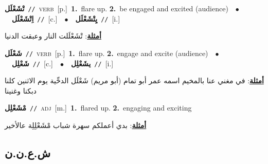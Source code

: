 \documentclass[10pt,a4paper,twoside]{article} %
\begin{document}
\begin{multicols}{2}
{\setlength\topsep{0pt}\textbf{\foreignlanguage{arabic}{تْشَعْلَل}}\ {\color{gray}\texttt{//}\color{black}}\ \textsc{verb}\ [p.]\ \textbf{1.}~flare up.  \textbf{2.}~be engaged and excited (audience)\ \ $\bullet$\ \ \setlength\topsep{0pt}\textbf{\foreignlanguage{arabic}{اِتْشَعْلَل}}\ {\color{gray}\texttt{//}\color{black}}\ [c.]\ \ $\bullet$\ \ \setlength\topsep{0pt}\textbf{\foreignlanguage{arabic}{يِتْشَعْلَل}}\ {\color{gray}\texttt{//}\color{black}}\ [i.]\  \begin{flushright}\color{gray}\foreignlanguage{arabic}{\textbf{\underline{\foreignlanguage{arabic}{أمثلة}}}: تْشَعْلَلت النار وعبقت الدنيا}\end{flushright}\color{black}} \vspace{2mm}

{\setlength\topsep{0pt}\textbf{\foreignlanguage{arabic}{شَعْلَل}}\ {\color{gray}\texttt{//}\color{black}}\ \textsc{verb}\ [p.]\ \textbf{1.}~flare up.  \textbf{2.}~engage and excite (audience)\ \ $\bullet$\ \ \setlength\topsep{0pt}\textbf{\foreignlanguage{arabic}{شَعْلِل}}\ {\color{gray}\texttt{//}\color{black}}\ [c.]\ \ $\bullet$\ \ \setlength\topsep{0pt}\textbf{\foreignlanguage{arabic}{يشَعْلِل}}\ {\color{gray}\texttt{//}\color{black}}\ [i.]\  \begin{flushright}\color{gray}\foreignlanguage{arabic}{\textbf{\underline{\foreignlanguage{arabic}{أمثلة}}}: في مغني عنا بالمخيم اسمه عمر أبو تمام (أبو مريم) شَعْلَل الدحِّية يوم الاثنين كلنا دبكنا وغنينا}\end{flushright}\color{black}} \vspace{2mm}

{\setlength\topsep{0pt}\textbf{\foreignlanguage{arabic}{مْشَعْلِل}}\ {\color{gray}\texttt{//}\color{black}}\ \textsc{adj}\ [m.]\ \textbf{1.}~flared up.  \textbf{2.}~engaging and exciting\  \begin{flushright}\color{gray}\foreignlanguage{arabic}{\textbf{\underline{\foreignlanguage{arabic}{أمثلة}}}: بدي أعملكم سهرة شباب مْشَعْلِلِة عالأخير}\end{flushright}\color{black}} \vspace{2mm}

\vspace{-3mm}
\subsection*{\color{blue}\foreignlanguage{arabic}{ش.ع.ن.ن}\color{blue}{}} 


\end{multicols}
\end{document}
